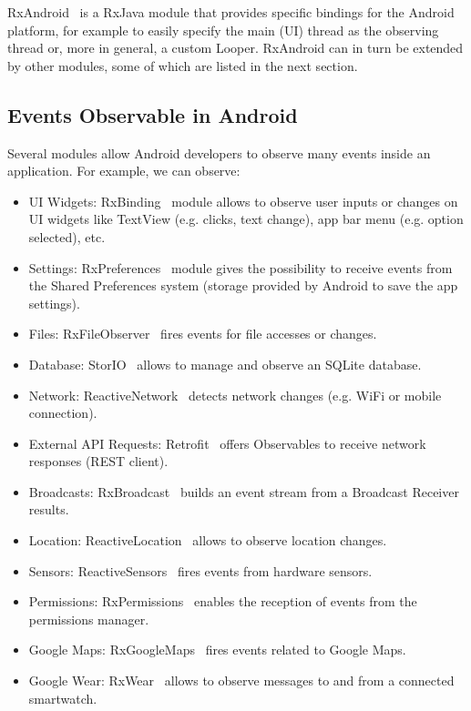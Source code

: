 \documentclass[11pt,a4paper,notitlepage]{article}
\begin{document}
RxAndroid~\cite{RxAndroid} is a RxJava module that provides specific bindings for the Android platform, for example to easily specify the main (UI) thread as the observing thread or, more in general, a custom Looper. RxAndroid can in turn be extended by other modules, some of which are listed in the next section.

\subsection{Events Observable in Android}\label{android_observables}
Several modules allow Android developers to observe many events inside an application. For example, we can observe:
\begin{itemize}
	\item UI Widgets: RxBinding~\cite{RxBinding} module allows to observe user inputs or changes on UI widgets like TextView (e.g. clicks, text change), app bar menu (e.g. option selected), etc.
	\item Settings: RxPreferences~\cite{RxPreferences} module gives the possibility to receive events from the Shared Preferences system (storage provided by Android to save the app settings).
	\item Files: RxFileObserver~\cite{RxFileObserver} fires events for file accesses or changes.
	\item Database: StorIO~\cite{StorIO} allows to manage and observe an SQLite database.
	\item Network: ReactiveNetwork~\cite{ReactiveNetwork} detects network changes (e.g. WiFi or mobile connection).
	\item External API Requests: Retrofit~\cite{Retrofit} offers Observables to receive network responses (REST client).
	\item Broadcasts: RxBroadcast~\cite{RxBroadcast} builds an event stream from a Broadcast Receiver results.
	\item Location: ReactiveLocation~\cite{ReactiveLocation} allows to observe location changes.
	\item Sensors: ReactiveSensors~\cite{ReactiveSensors} fires events from hardware sensors.
	\item Permissions: RxPermissions~\cite{RxPermissions} enables the reception of events from the permissions manager.
	\item Google Maps: RxGoogleMaps~\cite{RxGoogleMaps} fires events related to Google Maps.
	\item Google Wear: RxWear~\cite{RxWear} allows to observe messages to and from a connected smartwatch.
\end{itemize}
\end{document}
